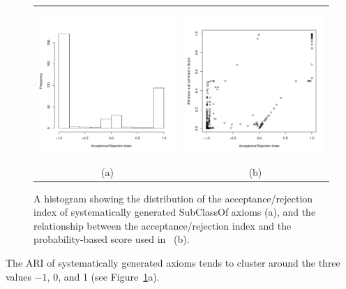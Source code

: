 \documentclass{llncs}
\begin{document}
\begin{figure}[t]
\begin{center}
  \begin{tabular}{cc}
    \includegraphics[height=2.25in]{ARI-hist} &
    \includegraphics[height=2.25in]{ARI-BLS} \\
    (a) & (b)
  \end{tabular}
\end{center}
\caption{A histogram showing the distribution of the acceptance/rejection index
  of systematically generated \textsf{SubClassOf} axioms (a),
  and the relationship between the acceptance/rejection index and the probability-based
  score used in~\cite{BuehmannLehmann2012} (b).}
\label{fig:ARI}
\end{figure}

The ARI of systematically generated axioms tends to cluster
around the three values $-1$, 0, and 1 (see Figure~\ref{fig:ARI}a).
\end{document}
